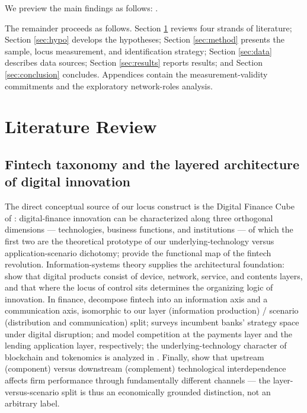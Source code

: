 We preview the main findings as follows: .

The remainder proceeds as follows. Section \ref{sec:lit} reviews four strands of
literature; Section \ref{sec:hypo} develops the hypotheses; Section \ref{sec:method}
presents the sample, locus measurement, and identification strategy; Section
\ref{sec:data} describes data sources; Section \ref{sec:results} reports results; and
Section \ref{sec:conclusion} concludes. Appendices contain the measurement-validity
commitments and the exploratory network-roles analysis.

\section{Literature Review}\label{sec:lit}

\subsection{Fintech taxonomy and the layered architecture of digital innovation}

The direct conceptual source of our locus construct is the Digital Finance Cube of
\textcite{gomber2017cube}: digital-finance innovation can be characterized along three
orthogonal dimensions — technologies, business functions, and institutions — of which
the first two are the theoretical prototype of our underlying-technology versus
application-scenario dichotomy; \textcite{gomber2018fintech} provide the functional map
of the fintech revolution. Information-systems theory supplies the architectural
foundation: \textcite{yoo2010layered} show that digital products consist of device,
network, service, and contents layers, and that where the locus of control sits
determines the organizing logic of innovation. In finance,
\textcite{boot2021fintech} decompose fintech into an information axis and a
communication axis, isomorphic to our layer (information production) / scenario
(distribution and communication) split; \textcite{vives2019digital} surveys incumbent
banks' strategy space under digital disruption; \textcite{parlour2022payments} and
\textcite{berg2022fintechlending} model competition at the payments layer and the
lending application layer, respectively; the underlying-technology character of
blockchain and tokenomics is analyzed in
\parencite{conghe2019blockchain,cong2021tokenomics}. Finally,
\textcite{adner2010ecosystem} show that upstream (component) versus downstream
(complement) technological interdependence affects firm performance through
fundamentally different channels — the layer-versus-scenario split is thus an
economically grounded distinction, not an arbitrary label.

